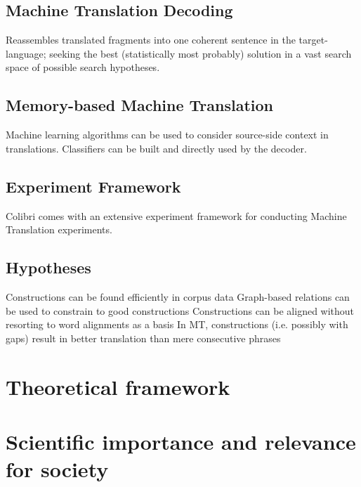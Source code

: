 \documentclass[12pt]{article}
\begin{document}
\subsection{Machine Translation Decoding} Reassembles translated fragments into one coherent sentence in the target-language; seeking the best (statistically most probably) solution in a vast search space of possible search hypotheses.
\subsection{Memory-based Machine Translation} Machine learning algorithms can be used to consider source-side context in translations. Classifiers can be built and directly used by the decoder.
\subsection{Experiment Framework} Colibri comes with an extensive experiment framework for conducting Machine Translation experiments.\

\subsection{Hypotheses} %

Constructions can be found efficiently in corpus data
Graph-based relations can be used to constrain to good constructions
Constructions can be aligned without resorting to word alignments as a basis
In MT, constructions (i.e. possibly with gaps) result in better translation than mere consecutive phrases



\section{Theoretical framework}



\section{Scientific importance and relevance for society}

\end{document}
